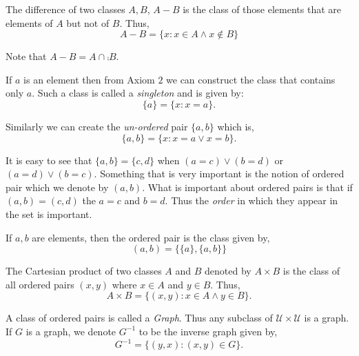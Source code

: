 \begin{Definition}
    The difference of two classes $A,B$, $A - B$ is the class of those elements that are elements of $A$ but
    not of $B$. Thus,
    \begin{equation*}
	A - B = \left.\lbrace x : x \in A \land x \not\in B \rbrace\right.
    \end{equation*}
\end{Definition}
Note that $A - B = A \cap \comp{B}$.

If $a$ is an element then from Axiom $2$ we can construct the class that contains only $a$. Such a
class is called a \textit{singleton} and is given by:
\begin{equation*}
    \lbrace a \rbrace =\lbrace x : x = a \rbrace.
\end{equation*}

Similarly we can create the \textit{un-ordered} pair $\lbrace a,b \rbrace$ which is,
\begin{equation*}
    \lbrace a,b \rbrace = \lbrace x : x = a \lor x = b \rbrace.
\end{equation*}

It is easy to see that $\lbrace a,b \rbrace = \lbrace c,d \rbrace$ 
when $(a = c) \lor (b = d)$ or $ (a = d) \lor (b = c)$. Something that is very important is the notion of
ordered pair which we denote by $(a,b)$. What is important about ordered pairs is that if 
$(a,b) = (c,d)$ the $a = c$ and $b = d$. Thus the \textit{order} in which they appear in the set is
important.

\begin{Definition}
    If $a,b$ are elements, then the ordered pair is the class given by,
    \begin{equation*}
	(a,b) = \left.\lbrace \lbrace a \rbrace, \lbrace a,b \rbrace \rbrace\right.
    \end{equation*}
\end{Definition}

\begin{Definition}
    The Cartesian product of two classes $A$ and $B$ denoted by $A \times B$ 
    is the class of all ordered pairs $(x,y)$ where $x \in A$ and $y \in B$. Thus,
    \begin{equation*}
	A \times B = \left.\lbrace (x,y) : x \in A \land y \in B \right.\rbrace.
    \end{equation*}
\end{Definition}

A class of ordered pairs is called a \textit{Graph}. Thus any subclass of $\mathcal{U} \times
\mathcal{U}$ is a graph. If $G$ is a graph, we denote $G^{-1}$ to be the inverse graph given by,
\begin{equation*}
    G^{-1} = \left.\lbrace (y,x) : (x,y) \in G \right.\rbrace.
\end{equation*}

